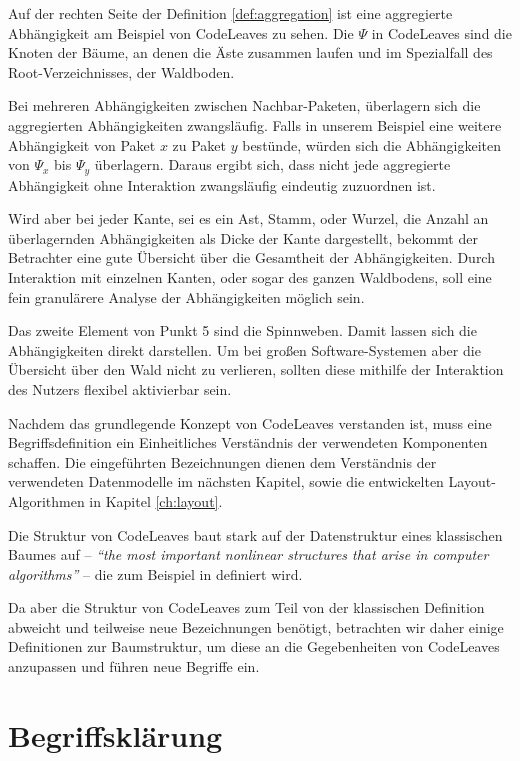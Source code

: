 Auf der rechten Seite der Definition \ref{def:aggregation} ist eine aggregierte Abhängigkeit am Beispiel von CodeLeaves zu sehen. Die $\Psi$ in CodeLeaves sind die Knoten der Bäume, an denen die Äste zusammen laufen und im Spezialfall des Root-Verzeichnisses, der Waldboden.

Bei mehreren Abhängigkeiten zwischen Nachbar-Paketen, überlagern sich die aggregierten Abhängigkeiten zwangsläufig. Falls in unserem Beispiel eine weitere Abhängigkeit von Paket $x$ zu Paket $y$ bestünde, würden sich die Abhängigkeiten von $\Psi_x$ bis $\Psi_y$ überlagern. Daraus ergibt sich, dass nicht jede aggregierte Abhängigkeit ohne Interaktion zwangsläufig eindeutig zuzuordnen ist.

Wird aber bei jeder Kante, sei es ein Ast, Stamm, oder Wurzel, die Anzahl an überlagernden Abhängigkeiten als Dicke der Kante dargestellt, bekommt der Betrachter eine gute Übersicht über die Gesamtheit der Abhängigkeiten. Durch Interaktion mit einzelnen Kanten, oder sogar des ganzen Waldbodens, soll eine fein granulärere Analyse der Abhängigkeiten möglich sein.

Das zweite Element von Punkt 5 sind die Spinnweben. Damit lassen sich die Abhängigkeiten direkt darstellen. Um bei großen Software-Systemen aber die Übersicht über den Wald nicht zu verlieren, sollten diese mithilfe der Interaktion des Nutzers flexibel aktivierbar sein.

Nachdem das grundlegende Konzept von CodeLeaves verstanden ist, muss eine Begriffsdefinition ein Einheitliches Verständnis der verwendeten Komponenten schaffen. Die eingeführten Bezeichnungen dienen dem Verständnis der verwendeten Datenmodelle im nächsten Kapitel, sowie die entwickelten Layout-Algorithmen in Kapitel \ref{ch:layout}.

Die Struktur von CodeLeaves baut stark auf der Datenstruktur eines klassischen Baumes auf -- \textit{"`the most important nonlinear structures that arise in computer algorithms"'}\cite{knuth1973fundamental} -- die zum Beispiel in \cite{knuth1973fundamental, ernst2016grundkurs, gumm2009einfuehrung} definiert wird.

Da aber die Struktur von CodeLeaves zum Teil von der klassischen Definition abweicht und teilweise neue Bezeichnungen benötigt, betrachten wir daher einige Definitionen zur Baumstruktur, um diese an die Gegebenheiten von CodeLeaves anzupassen und führen neue Begriffe ein.

\section{Begriffsklärung}
\label{sec:naming}

